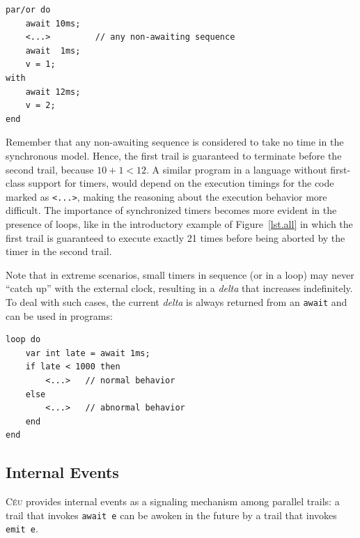 \documentclass[letterpaper]{sig-alternate}
\newcommand{\code}[1] {{\small{\texttt{#1}}}}
\newcommand{\CEU}{\textsc{C\'{e}u}\xspace}
\begin{document}
\nopagebreak
\noindent
\begin{minipage}{\linewidth}
\begin{lstlisting}[xleftmargin=2em]
par/or do
    await 10ms;
    <...>         // any non-awaiting sequence
    await  1ms;
    v = 1;
with
    await 12ms;
    v = 2;
end
\end{lstlisting}
\end{minipage}

Remember that any non-awaiting sequence is considered to take no time in the 
synchronous model.
Hence, the first trail is guaranteed to terminate before the second trail, 
because $10+1 < 12$.
A similar program in a language without first-class support for timers, would 
depend on the execution timings for the code marked as \code{<...>}, making the 
reasoning about the execution behavior more difficult.
%
The importance of synchronized timers becomes more evident in the presence of 
loops, like in the introductory example of Figure~\ref{lst.all} in which the 
first trail is guaranteed to execute exactly 21 times before being aborted by 
the timer in the second trail.

Note that in extreme scenarios, small timers in sequence (or in a loop) may 
never ``catch up'' with the external clock, resulting in a \emph{delta} that
increases indefinitely.
To deal with such cases, the current \emph{delta} is always returned from an 
\code{await} and can be used in programs:

\begin{lstlisting}
loop do
    var int late = await 1ms;
    if late < 1000 then
        <...>   // normal behavior
    else
        <...>   // abnormal behavior
    end
end
\end{lstlisting}


\subsection{Internal Events}
\label{sec.ceu.ints}


\CEU provides internal events as a signaling mechanism among parallel trails:
a trail that invokes \code{await~e} can be awoken in the future by a trail that 
invokes \code{emit~e}.
\end{document}
